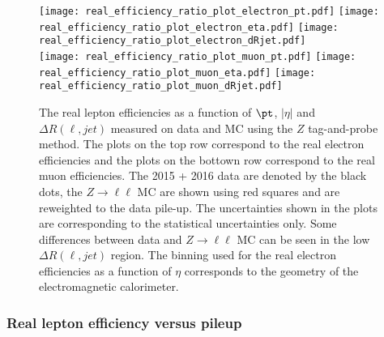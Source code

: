 \begin{figure}[htbp]
    \texttt{[image: real\_efficiency\_ratio\_plot\_electron\_pt.pdf]}
    \texttt{[image: real\_efficiency\_ratio\_plot\_electron\_eta.pdf]}
    \texttt{[image: real\_efficiency\_ratio\_plot\_electron\_dRjet.pdf]}\\
    \texttt{[image: real\_efficiency\_ratio\_plot\_muon\_pt.pdf]}
    \texttt{[image: real\_efficiency\_ratio\_plot\_muon\_eta.pdf]}
    \texttt{[image: real\_efficiency\_ratio\_plot\_muon\_dRjet.pdf]}
    \caption{The real lepton efficiencies as a function of $\pt$, $|\eta|$ and $\Delta R(\ell, jet)$ measured on data and MC using the $Z$ tag-and-probe method.
    The plots on the top row correspond to the real electron efficiencies and the plots on the bottown row correspond to the real muon efficiencies.
    The 2015 + 2016 data are denoted by the black dots, the $Z\to\ell\ell$ MC are shown using red squares and are reweighted to the data pile-up.
    The uncertainties shown in the plots are corresponding to the statistical uncertainties only.
    Some differences between data and $Z\to \ell\ell$ MC can be seen in the low $\Delta R(\ell, jet)$ region.
    The binning used for the real electron efficiencies as a function of $\eta$ corresponds to the geometry of the electromagnetic calorimeter.}
    \label{fig:app_RLE_real_efficiency_pt_eta_dRjet}
\end{figure}



\subsubsection{Real lepton efficiency versus pileup}
\label{subsubsec:RLE_vs_pileup}
 
